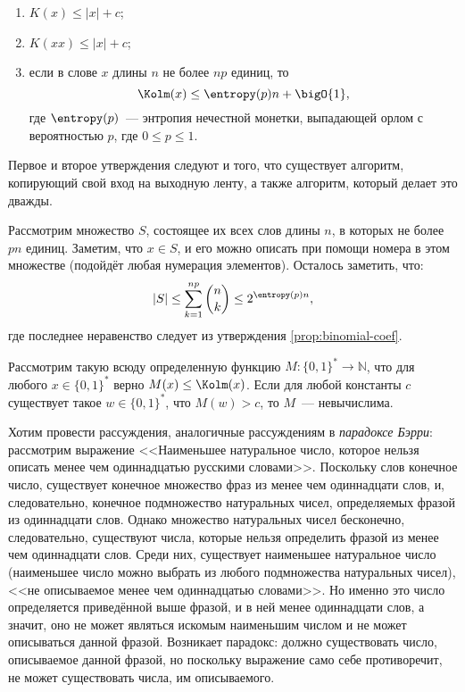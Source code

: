 \begin{enumerate}
    \item $K(x) \le |x| + c$;
    \item $K(xx) \le |x| + c$;
    \item если в слове $x$ длины $n$ не более $np$ единиц, то
        $$
            \Kolm(x) \le \entropy(p) n + \bigO{1},
        $$ 
        где $\entropy(p)$~--- энтропия нечестной монетки, выпадающей орлом с вероятностью $p$, где $0 \le
        p \le 1$.
\end{enumerate}

Первое и второе утверждения следуют и того, что существует алгоритм, копирующий свой вход на выходную
ленту, а также алгоритм, который делает это дважды.

Рассмотрим множество $S$, состоящее их всех слов длины $n$, в которых не более $pn$ единиц. Заметим, что
$x \in S$, и его можно описать при помощи номера в этом множестве (подойдёт любая нумерация
элементов). Осталось заметить, что:
$$
    |S| \le \sum_{k = 1}^{np} \binom{n}{k} \leq 2^{\entropy(p) n},
$$
где последнее неравенство следует из утверждения \ref{prop:binomial-coef}.


\begin{theorem}
    Рассмотрим такую всюду определенную функцию $M\colon \{0, 1\}^{*} \to \mathbb{N}$, что для любого $x
    \in \{0, 1\}^{*}$ верно $M(x) \le \Kolm(x)$. Если для любой константы $c$ существует такое
    $w \in \{0, 1\}^{*}$, что $M(w) > c$, то $M$~--- невычислима.
\end{theorem}

Хотим провести рассуждения, аналогичные рассуждениям в \textit{парадоксе Бэрри}: рассмотрим выражение
<<Наименьшее натуральное число, которое нельзя описать менее чем одиннадцатью русскими
словами>>. Поскольку слов конечное число, существует конечное множество фраз из менее чем одиннадцати
слов, и, следовательно, конечное подмножество натуральных чисел, определяемых фразой из одиннадцати
слов. Однако множество натуральных чисел бесконечно, следовательно, существуют числа, которые нельзя
определить фразой из менее чем одиннадцати слов. Среди них, существует наименьшее натуральное число
(наименьшее число можно выбрать из любого подмножества натуральных чисел), <<не описываемое менее чем
одиннадцатью словами>>. Но именно это число определяется приведённой выше фразой, и в ней менее
одиннадцати слов, а значит, оно не может являться искомым наименьшим числом и не может описываться данной
фразой. Возникает парадокс: должно существовать число, описываемое данной фразой, но поскольку выражение
само себе противоречит, не может существовать числа, им описываемого.
    
